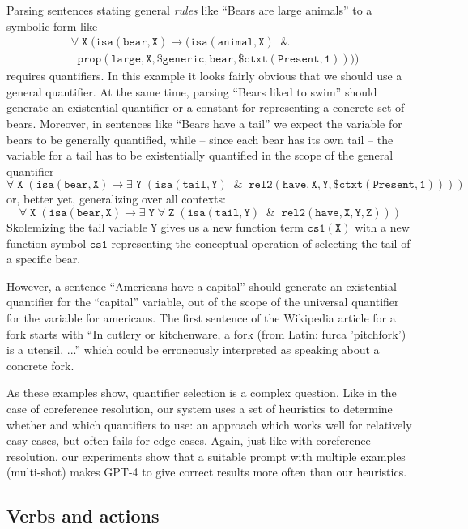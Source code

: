 \documentclass[runningheads]{llncs}
\begin{document}
Parsing sentences stating general {\em rules} like ``Bears are large animals'' to a symbolic form
like 
\begin{align*}
  &\mathtt{\forall \; X \;(isa(bear,X) \rightarrow (isa(animal,X) \; \; \&  }\\
  &\mathtt{\; \; prop(large,X,\$generic,bear,\$ctxt(Present,1))))}
\end{align*}
requires quantifiers. In this example it looks fairly obvious that we should use a general quantifier. At the same time,
parsing ``Bears liked to swim'' should generate an existential quantifier or a constant for representing 
a concrete set of bears. Moreover, in sentences like ``Bears have a tail'' we expect the variable for bears to be generally
quantified, while -- since each bear has its own tail -- the variable for a tail has to be existentially quantified in the scope of the general quantifier
$$\mathtt{\forall \; X \;(isa(bear,X) \rightarrow \exists \; Y  \;(isa(tail,Y) \; \; \& \; \; rel2(have,X,Y,\$ctxt(Present,1))))}$$
or, better yet, generalizing over all contexts:
$$\mathtt{\forall \; X \;(isa(bear,X) \rightarrow \exists \; Y  \; \forall \; Z \; (isa(tail,Y) \; \; \& \; \; rel2(have,X,Y,Z)))}$$
Skolemizing the tail variable $\mathtt{Y}$ gives us a new function term $\mathtt{cs1(X)}$ with a new function symbol $\mathtt{cs1}$
representing the conceptual operation of selecting the tail of a specific bear.

However, a sentence ``Americans have a capital'' should generate an existential quantifier for the ``capital'' variable, 
out of the scope of the universal quantifier for the variable for americans. The first sentence of the Wikipedia  article for
a fork starts with ``In cutlery or kitchenware, a fork (from Latin: furca 'pitchfork') is a utensil, ...'' which could
be erroneously interpreted as speaking about a concrete fork.

As these examples show, quantifier selection is a complex question. Like in the case of coreference resolution, our system
uses a set of heuristics to determine whether and which quantifiers to use: an approach which works well for
relatively easy cases, but often fails for edge cases. Again, just like with coreference resolution, our experiments
show that a suitable prompt with multiple examples (multi-shot) makes GPT-4 to give correct results more often than
our heuristics.


\subsection{Verbs and actions}
\end{document}
